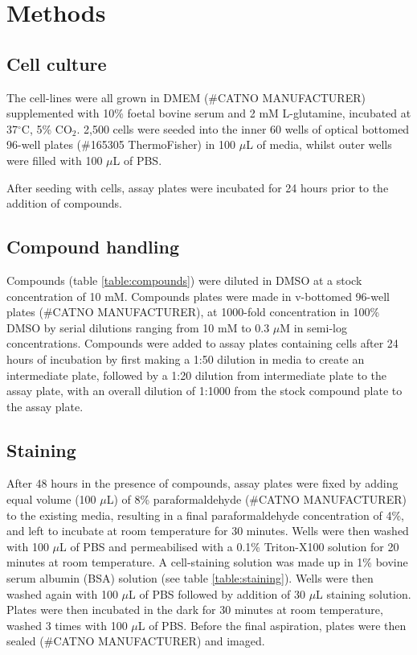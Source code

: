 \documentclass[a4paper,11pt,twoside,openright]{scrbook}
\begin{document}





\section{Methods}

\subsection{Cell culture}
The cell-lines were all grown in DMEM (\#CATNO MANUFACTURER) supplemented with 10\% foetal bovine serum and 2 mM L-glutamine, incubated at 37$^\circ$C, 5\% CO$_2$.
2,500 cells were seeded into the inner 60 wells of optical bottomed 96-well plates (\#165305 ThermoFisher) in 100 $\mu$L of media, whilst outer wells were filled with 100 $\mu$L of PBS.

After seeding with cells, assay plates were incubated for 24 hours prior to the addition of compounds.


\subsection{Compound handling}
Compounds (table \ref{table:compounds}) were diluted in DMSO at a stock concentration of 10 mM.
Compounds plates were made in v-bottomed 96-well plates (\#CATNO MANUFACTURER), at 1000-fold concentration in 100\% DMSO by serial dilutions ranging from 10 mM to 0.3 $\mu$M in semi-log concentrations.
Compounds were added to assay plates containing cells after 24 hours of incubation by first making a 1:50 dilution in media to create an intermediate plate, followed by a 1:20 dilution from intermediate plate to the assay plate, with an overall dilution of 1:1000 from the stock compound plate to the assay plate.


\subsection{Staining}
After 48 hours in the presence of compounds, assay plates were fixed by adding equal volume (100 $\mu$L) of 8\% paraformaldehyde (\#CATNO MANUFACTURER) to the existing media, resulting in a final paraformaldehyde concentration of 4\%, and left to incubate at room temperature for 30 minutes.
Wells were then washed with 100 $\mu$L of PBS and permeabilised with a 0.1\% Triton-X100 solution for 20 minutes at room temperature.
A cell-staining solution was made up in 1\% bovine serum albumin (BSA) solution (see table \ref{table:staining}).
Wells were then washed again with 100 $\mu$L of PBS followed by addition of 30 $\mu$L staining solution.
Plates were then incubated in the dark for 30 minutes at room temperature, washed 3 times with 100 $\mu$L of PBS.
Before the final aspiration, plates were then sealed (\#CATNO MANUFACTURER) and imaged.
\end{document}
